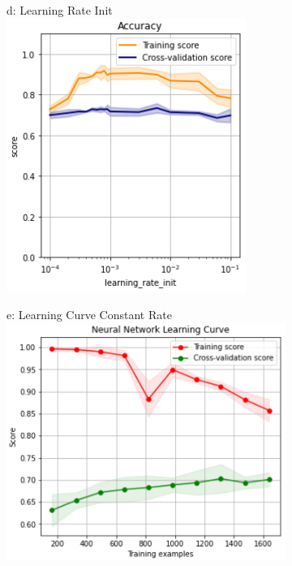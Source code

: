 \documentclass{article}
\begin{document}
\begin{figure}
\begin{subfigure}{.24\textwidth}
	\end{subfigure}
	\begin{subfigure}{.24\textwidth}
		\centering
		d: Learning Rate Init\\
		\includegraphics[width=\linewidth]{poland_nn_learning_rate.png}
		
	\end{subfigure}
	\begin{subfigure}{.38\textwidth}
		\centering
		e: Learning Curve Constant Rate\\
		\includegraphics[width=\linewidth]{poland_nn_learning_curve_constant.png}
		

\end{subfigure}
\end{figure}
\end{document}
